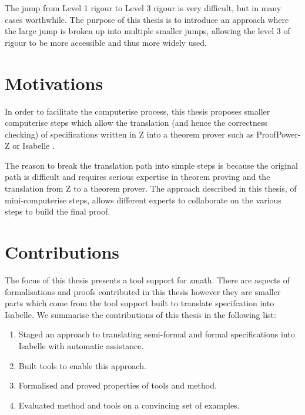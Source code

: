 The jump from Level 1 rigour to Level 3 rigour is very difficult, but in many cases worthwhile. The purpose of this thesis is to introduce an approach where the large jump is broken up into multiple smaller jumps, allowing the level 3 of rigour to be more accessible and thus more widely used. 

\section{Motivations}

In order to facilitate the \gls{computerise} process, this thesis proposes smaller \gls{computerise} steps which allow the translation (and hence the correctness checking) of specifications written in Z into a theorem prover such as ProofPower-Z \cite{pp} or Isabelle \cite{isabelle}.

The reason to break the translation path into simple steps is because the original path is difficult and requires serious expertise in theorem proving and the translation from Z to a theorem prover. The approach  described in this thesis, of mini-\gls{computerise} steps, allows different experts to collaborate on the various steps to build the final proof.



\section{Contributions}

The focus of this thesis presents a tool support for \gls{zmath}. There are aspects of formalisations and proofs contributed in this thesis however they are smaller parts which come from the tool support built to translate specifcation into Isabelle. We summarise the contributions of this thesis in the following list:

\begin{enumerate}
\item Staged an approach to translating semi-formal and formal specifications into Isabelle with automatic assistance.
\item Built tools to enable this approach.
\item Formalised and proved properties of tools and method.
\item Evaluated method and tools on a convincing set of examples.
\end{enumerate}

